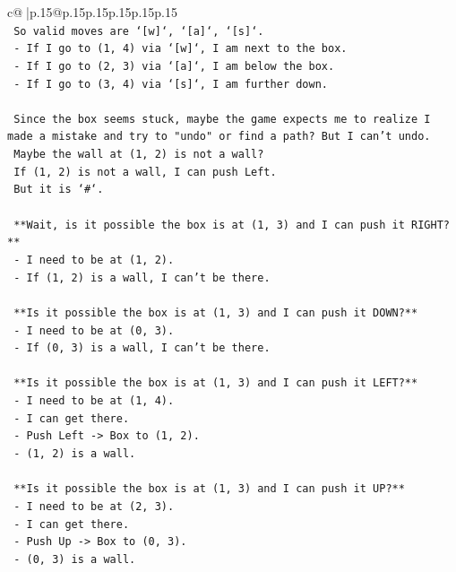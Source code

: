 \documentclass{article}
\begin{document}
{\begin{supertabular}{c@{$\;$}|p{.15\linewidth}@{}p{.15\linewidth}p{.15\linewidth}p{.15\linewidth}p{.15\linewidth}p{.15\linewidth}}
{{{\\ 
\texttt{  So valid moves are `{[}w{]}`, `{[}a{]}`, `{[}s{]}`.} \\
\texttt{  {-} If I go to (1, 4) via `{[}w{]}`, I am next to the box.} \\
\texttt{  {-} If I go to (2, 3) via `{[}a{]}`, I am below the box.} \\
\texttt{  {-} If I go to (3, 4) via `{[}s{]}`, I am further down.} \\
\\ 
\texttt{  Since the box seems stuck, maybe the game expects me to realize I made a mistake and try to "undo" or find a path? But I can't undo.} \\
\texttt{  Maybe the wall at (1, 2) is not a wall?} \\
\texttt{  If (1, 2) is not a wall, I can push Left.} \\
\texttt{  But it is `\#`.} \\
\\ 
\texttt{  **Wait, is it possible the box is at (1, 3) and I can push it RIGHT?**} \\
\texttt{  {-} I need to be at (1, 2).} \\
\texttt{  {-} If (1, 2) is a wall, I can't be there.} \\
\\ 
\texttt{  **Is it possible the box is at (1, 3) and I can push it DOWN?**} \\
\texttt{  {-} I need to be at (0, 3).} \\
\texttt{  {-} If (0, 3) is a wall, I can't be there.} \\
\\ 
\texttt{  **Is it possible the box is at (1, 3) and I can push it LEFT?**} \\
\texttt{  {-} I need to be at (1, 4).} \\
\texttt{  {-} I can get there.} \\
\texttt{  {-} Push Left {-}> Box to (1, 2).} \\
\texttt{  {-} (1, 2) is a wall.} \\
\\ 
\texttt{  **Is it possible the box is at (1, 3) and I can push it UP?**} \\
\texttt{  {-} I need to be at (2, 3).} \\
\texttt{  {-} I can get there.} \\
\texttt{  {-} Push Up {-}> Box to (0, 3).} \\
\texttt{  {-} (0, 3) is a wall.} \\
}}}
\end{supertabular}}
\end{document}
